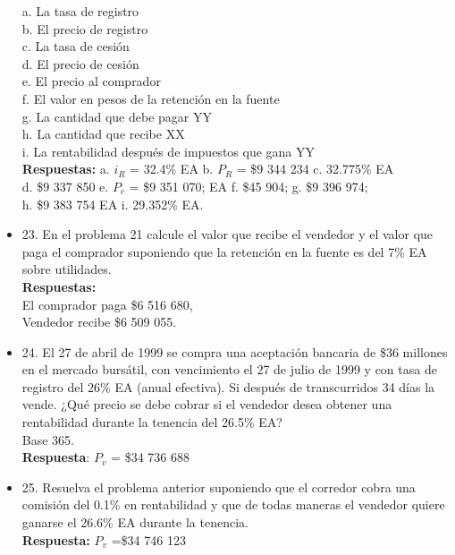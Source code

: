 \begin{itemize}
	a.	La tasa de registro\\
	b.	El precio de registro\\
	c.	La tasa de cesión\\
	d.	El precio de cesión\\
	e.	El precio al comprador\\
	f.	El valor en pesos de la retención en la fuente\\
	g.	La cantidad que debe pagar YY\\
	h.	La cantidad que recibe XX\\
	i.	La rentabilidad después de impuestos que gana YY\\
	\textbf{Respuestas:} a. $i_{R}$ = 32.4\% EA\hspace{0,5cm}  b. $P_{R}$ = \$9 344 234\hspace{0,5cm}   c. 32.775\% EA\hspace{0,5cm}  \\
	d. \$9 337 850\hspace{0,5cm}   e.  $P_{c}$ = \$9 351 070;  EA\hspace{0,5cm}    f. \$45 904;  \hspace{0,5cm}   g. \$9 396 974; \hspace{0,5cm}\\
	h. \$9 383 754 \hspace{0,5cm} EA\hspace{0,5cm}   i. 29.352\% EA.\\
	\medskip
	\item 23. En el problema 21 calcule el valor que recibe el vendedor y el valor que paga el comprador suponiendo que la retención en la fuente es del 7\% EA sobre utilidades.\\
	\textbf{Respuestas:}\\
	El comprador paga \$6 516 680,\\
	Vendedor recibe \$6 509 055.\\
	\medskip
	\item 24. El 27 de abril de 1999 se compra una aceptación bancaria de \$36 millones en el mercado bursátil, con vencimiento el 27 de julio de 1999 y con tasa de registro del 26\% EA (anual efectiva). Si después de transcurridos 34 días la vende. ¿Qué precio se debe cobrar si el vendedor desea obtener una rentabilidad durante la tenencia del 26.5\% EA?\\
	Base 365.\\
	\textbf{Respuesta}: $P_{v}$ = \$34 736 688\\
	\medskip
	\item 25. Resuelva el problema anterior suponiendo que el corredor cobra una comisión del 0.1\% en rentabilidad y que de todas maneras el vendedor quiere ganarse el 26.6\% EA durante la tenencia.\\
	\textbf{Respuesta:} $P_{v}$ =\$34 746 123\\
	
	
\end{itemize}


